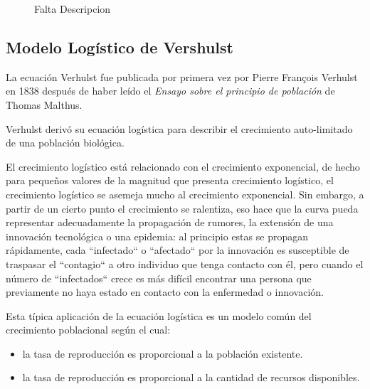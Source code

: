 \begin{figure}[!ht]
\begin{center}
\end{center}\vspace*{-0.6cm}
\caption[Imagen de Oncogenes. Falta poner leyenda]{Falta Descripcion}
\label{fig-gompertz}
\end{figure}
\newpage

\subsection{Modelo Logístico de Vershulst}
La ecuación Verhulst fue publicada por primera vez por Pierre François Verhulst en 1838 después de haber leído el \textit{Ensayo sobre el principio de población} de Thomas Malthus.

Verhulst derivó su ecuación logística para describir el crecimiento auto-limitado de una población biológica.

El crecimiento logístico está relacionado con el crecimiento exponencial, de hecho para pequeños valores de la magnitud que presenta crecimiento logístico, el crecimiento logístico se asemeja mucho al crecimiento exponencial. Sin embargo, a partir de un cierto punto el crecimiento se ralentiza, eso hace que la curva pueda representar adecuadamente la propagación de rumores, la extensión de una innovación tecnológica o una epidemia: al principio estas se propagan rápidamente, cada ``infectado`` o ``afectado`` por la innovación es susceptible de traspasar el ``contagio`` a otro individuo que tenga contacto con él, pero cuando el número de ``infectados`` crece es más difícil encontrar una persona que previamente no haya estado en contacto con la enfermedad o innovación.

Esta típica aplicación de la ecuación logística es un modelo común del crecimiento poblacional según el cual:
\begin{itemize}
    \item la tasa de reproducción es proporcional a la población existente.
    \item la tasa de reproducción es proporcional a la cantidad de recursos disponibles.
\end{itemize}

